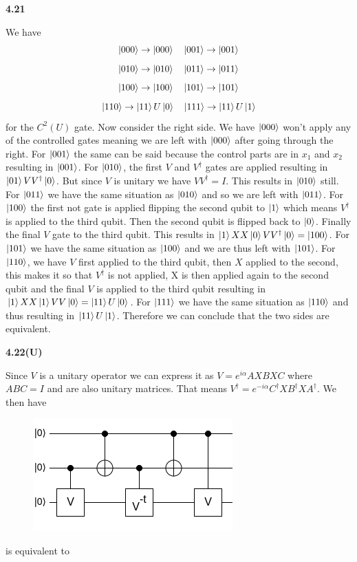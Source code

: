 \textbf{4.21}

We have \[\ket{000}\rightarrow \ket{000}\quad \ket{001} \rightarrow \ket{001}\]\[\ket{010} \rightarrow \ket{010} \quad \ket{011} \rightarrow \ket{011}\] \[\ket{100} \rightarrow \ket{100} \quad \ket{101} \rightarrow\ket{101}\] \[\ket{110} \rightarrow \ket{11}U\ket{0}\quad \ket{111}\rightarrow\ket{11}U\ket{1}\] for the $C^2(U)$ gate. Now consider the right side. We have $\ket{000}$ won't apply any of the controlled gates meaning we are left with $\ket{000}$ after going through the right. For $\ket{001}$ the same can be said because the control parts are in $x_1$ and $x_2$ resulting in $\ket{001}$. For $\ket{010}$, the first $V$ and $V^\dag$ gates are applied resulting in $\ket{01}VV^\dag\ket{0}$. But since $V$ is unitary we have $VV^\dag = I $. This results in $\ket{010}$ still. For $\ket{011}$ we have the same situation as $\ket{010}$ and so we are left with $\ket{011}$. For $\ket{100}$ the first not gate is applied flipping the second qubit to $\ket{1}$ which means $V^\dag$ is applied to the third qubit. Then the second qubit is flipped back to $\ket{0}$. Finally the final $V$ gate to the third qubit. This results in $ \ket{1}XX\ket{0}VV^\dag\ket{0} = \ket{100}$. For $\ket{101}$ we have the same situation as $\ket{100}$ and we are thus left with $ \ket{101}$. For $\ket{110}$, we have $V$ first applied to the third qubit, then $X$ applied to the second, this makes it so that $ V^\dag$ is not applied, X is then applied again to the second qubit and the final $V$ is applied to the third qubit resulting in $ \ket{1}XX\ket{1}VV\ket{0} = \ket{11}U \ket{0}$. For $\ket{111}$ we have the same situation as $\ket{110}$ and thus resulting in $\ket{11}U\ket{1}$. Therefore we can conclude that the two sides are equivalent. 

\textbf{4.22(U)}

Since $V$ is a unitary operator we can express it as  $V = e^{i\alpha}AXBXC$ where $ABC = I$ and are also unitary matrices. That means $ V^\dag =e^{-i\alpha}C^\dag XB^\dag XA^\dag $. We then have

\begin{figure}[H]
    \centering
    \includegraphics{images/4.22.1.png}
    \label{fig:1}
\end{figure}
is equivalent to 


